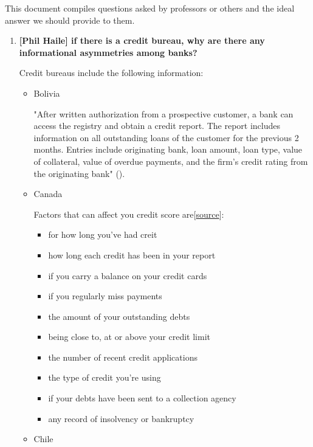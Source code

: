 \documentclass[12pt]{article}
\theoremstyle{plain}
\theoremstyle{plain}
\theoremstyle{definition}  %
\theoremstyle{remark}  %
\begin{document}
This document compiles questions asked by professors or others and the ideal answer we should provide to them. 

\begin{enumerate}
    \item \textbf{[Phil Haile] if there is a credit bureau, why are there any informational asymmetries among banks? }
    
    Credit bureaus include the following information: 
    \begin{itemize}
        \item Bolivia 

        "After written authorization from a prospective customer, a bank can access the registry and obtain a credit report. The report includes information on all outstanding loans of the customer for the previous 2 months. Entries include originating bank, loan amount, loan type, value of collateral, value of overdue payments, and the firm’s credit rating from the originating bank" (\cite{ioannidou_time_2010}). 
        \item Canada
        
        Factors that can affect you credit score are[\href{https://www.canada.ca/en/financial-consumer-agency/services/credit-reports-score/credit-report-score-basics.html}{source}]: 
        \begin{itemize}
            \item for how long you've had creit 
            \item how long each credit has been in your report
            \item if you carry a balance on your credit cards
            \item if you regularly miss payments
            \item the amount of your outstanding debts
            \item being close to, at or above your credit limit
            \item the number of recent credit applications
            \item the type of credit you’re using
            \item if your debts have been sent to a collection agency
            \item any record of insolvency or bankruptcy
        \end{itemize}


        \item Chile
        

\end{itemize}
\end{enumerate}
\end{document}

